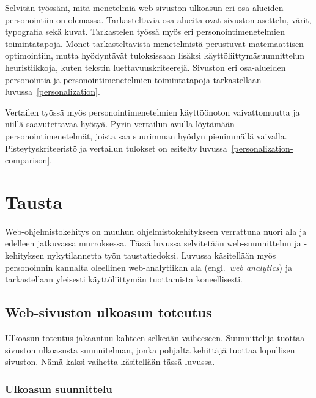 \documentclass[finnish, 12pt, a4paper, elec, utf8, a-1b, online]{aaltothesis}
\begin{document}
Selvitän työssäni, mitä menetelmiä web-sivuston ulkoasun eri osa-alueiden
personointiin on olemassa. Tarkasteltavia osa-alueita ovat sivuston asettelu,
värit, typografia sekä kuvat. Tarkastelen työssä myös eri personointimenetelmien
toimintatapoja. Monet tarkasteltavista menetelmistä perustuvat matemaattisen
optimointiin, mutta hyödyntävät tuloksissaan lisäksi käyttöliittymäsuunnittelun
heuristiikkoja, kuten tekstin luettavuuskriteerejä. Sivuston eri osa-alueiden
personointia ja personointimenetelmien toimintatapoja tarkastellaan
luvussa~\ref{personalization}.

Vertailen työssä myös personointimenetelmien käyttöönoton vaivattomuutta ja
niillä saavutettavaa hyötyä. Pyrin vertailun avulla löytämään
personointimenetelmät, joista saa suurimman hyödyn pienimmällä vaivalla.
Pisteytyskriteeristö ja vertailun tulokset on esitelty
luvussa~\ref{personalization-comparison}.

\clearpage

\section{Tausta}\label{background}

Web-ohjelmistokehitys on muuhun ohjelmistokehitykseen verrattuna nuori ala ja
edelleen jatkuvassa murroksessa. Tässä luvussa selvitetään web-suunnittelun ja
-kehityksen nykytilannetta työn taustatiedoksi. Luvussa käsitellään myös
personoinnin kannalta oleellinen web-analytiikan ala (engl.~\textit{web
analytics}) ja tarkastellaan yleisesti käyttöliittymän tuottamista
koneellisesti.

\subsection{Web-sivuston ulkoasun toteutus}

Ulkoasun toteutus jakaantuu kahteen selkeään vaiheeseen. Suunnittelija tuottaa
sivuston ulkoasusta suunnitelman, jonka pohjalta kehittäjä tuottaa lopullisen
sivuston. Nämä kaksi vaihetta käsitellään tässä luvussa.

\subsubsection{Ulkoasun suunnittelu}
\end{document}
